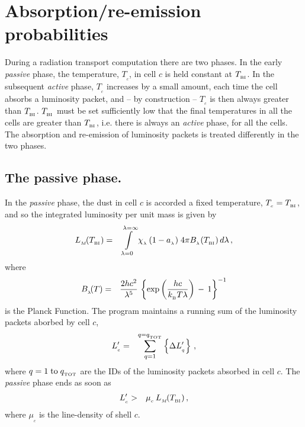 \documentclass[usenatbib]{mn2e}
\numberwithin{equation}{section}
\begin{document}
\section{Absorption/re-emission probabilities}\label{APP:abs-em}

During a radiation transport computation there are two phases. In the early {\it passive} phase, the temperature, $T_{_c}$, in cell $c$ is held constant at $T_{_{\rm BI}}$. In the subsequent {\it active} phase, $T_{_c}$ increases by a small amount, each time the cell absorbs a luminosity packet, and -- by construction -- $T_{_c}$ is then always greater than $T_{_{\rm BI}}$. $T_{_{\rm BI}}$ must be set sufficiently low that the final temperatures in all the cells are greater than $T_{_{\rm BI}}$, i.e. there is always an {\it active} phase, for all the cells. The absorption and re-emission of luminosity packets is treated differently in the two phases.

\subsection{The passive phase.}

\noindent In the {\it passive} phase, the dust in cell $c$ is accorded a fixed temperature, $T_{_c}=T_{_{\rm BI}}$, and so the integrated luminosity per unit mass is given by
\begin{eqnarray}
L_{_M}\!(T_{_{\rm BI}})&=&\int\limits_{\lambda=0}^{\lambda=\infty} \chi_{_\lambda}\,(1-a_{_\lambda})\;4\pi B_{_\lambda}(T_{_{\rm BI}})\,d\lambda\,,
\end{eqnarray}
where
\begin{eqnarray}
B_{_\lambda}\!(T)&=&\frac{2hc^2}{\lambda^5}\,\left\{\exp\left(\frac{hc}{k_{_{\rm B}}T\lambda}\right)\,-\,1\right\}^{-1}
\end{eqnarray}
is the Planck Function. The program maintains a running sum of the luminosity packets aborbed by cell $c$,
\begin{eqnarray}
L'_{_c}&=&\sum\limits_{q=1}^{q=q_{_{\rm TOT}}}\left\{\Delta L'_{_q}\right\}\,,
\end{eqnarray}
where $q=1\;{\rm to}\;q_{_{\rm TOT}}$ are the IDs of the luminosity packets absorbed in cell $c$. The {\it passive} phase ends as soon as 
\begin{eqnarray}
L'_{_c}&>&\mu_{_c}\,L_{_M}\!(T_{_{\rm BI}})\,,
\end{eqnarray}
where $\mu_{_c}$ is the line-density of shell $c$.
\end{document}
